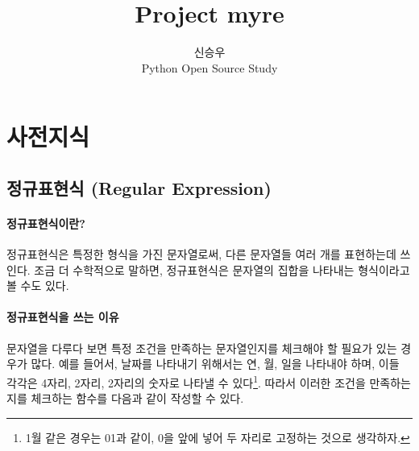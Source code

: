 \documentclass[twoside]{article}
\title{\vspace{-15mm}\fontsize{24pt}{10pt}\selectfont\textbf{ Project myre  }} %
\author{
\large
\textsc{신승우}\\[2mm]
\normalsize Python Open Source Study \\ %
\vspace{-5mm}
}
\date{}
\newcommand\fig[2]{
\begin{figure}[h]
  \centering
  \texttt{[image: \#1]}
  \caption{#2} 
  \label{fig:#1}
\end{figure}
}
\newcommand\code[4]{
}
\begin{document}
\maketitle %

















\section{사전지식} 

\subsection{정규표현식 (Regular Expression)}

\paragraph{정규표현식이란?} 정규표현식은 특정한 형식을 가진 문자열로써, 다른 문자열들 여러 개를 표현하는데 쓰인다. 조금 더 수학적으로 말하면, 정규표현식은 문자열의 집합을 나타내는 형식이라고 볼 수도 있다. 

\paragraph{정규표현식을 쓰는 이유} 문자열을 다루다 보면 특정 조건을 만족하는 문자열인지를 체크해야 할 필요가 있는 경우가 많다. 예를 들어서, 날짜를 나타내기 위해서는 연, 월, 일을 나타내야 하며, 이들 각각은 4자리, 2자리, 2자리의 숫자로 나타낼 수 있다\footnote{1월 같은 경우는 01과 같이, 0을 앞에 넣어 두 자리로 고정하는 것으로 생각하자.}. 따라서 이러한 조건을 만족하는지를 체크하는 함수를 다음과 같이 작성할 수 있다. 
\end{document}
